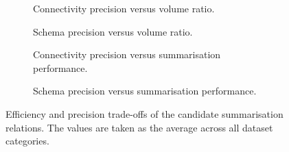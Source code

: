 \begin{figure}
	\centering
	\begin{subfigure}[t]{0.46\textwidth}
		\resizebox{\textwidth}{!}{
			
		}
		\caption{Connectivity precision versus volume ratio.}
		\label{fig:trade-conn-volume}
	\end{subfigure}
	\qquad
	\begin{subfigure}[t]{0.46\textwidth}
		\resizebox{\textwidth}{!}{
			
		}
		\caption{Schema precision versus volume ratio.}
		\label{fig:trade-schema-volume}
	\end{subfigure}
	\qquad%
	\begin{subfigure}[t]{0.46\textwidth}
		\resizebox{\textwidth}{!}{
			
		}
		\caption{Connectivity precision versus summarisation performance.}
		\label{fig:trade-conn-cpu}
	\end{subfigure}
	\qquad%
	\begin{subfigure}[t]{0.46\textwidth}
		\resizebox{\textwidth}{!}{
			
		}
		\caption{Schema precision versus summarisation performance.}
		\label{fig:trade-schema-cpu}
	\end{subfigure}
	\caption{Efficiency and precision trade-offs of the candidate summarisation relations. The values are taken as the average across all dataset categories.}
\end{figure}
